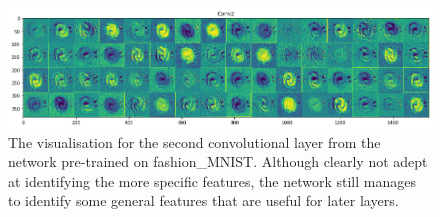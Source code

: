 \documentclass[12pt, onecolumn]{aa}
\begin{document}
\begin{figure}
    \centering
    \includegraphics[width=\linewidth]{Figures/activation_layers/fashion_conv2.png}
    \caption{The visualisation for the second convolutional layer from the network pre-trained on fashion\_MNIST. Although clearly not adept at identifying the more specific features, the network still manages to identify some general features that are useful for later layers.}
    \label{fig:fashionconv2}
\end{figure}
\end{document}
